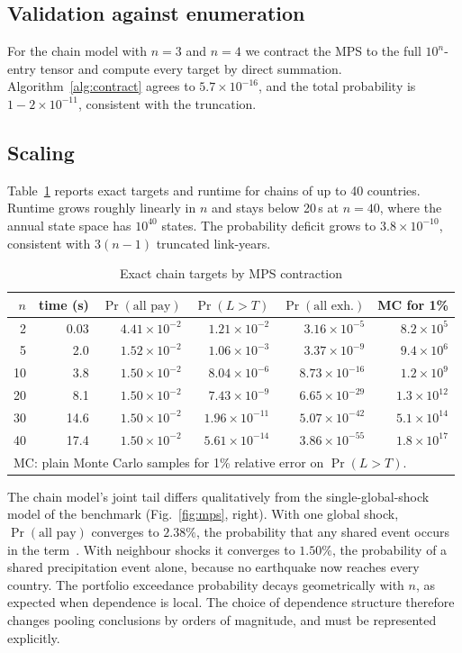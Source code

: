 \documentclass[conference]{IEEEtran}
\begin{document}
\subsection{Validation against enumeration}\label{sec:valid}
For the chain model with $n=3$ and $n=4$ we contract the MPS to the full $10^{n}$-entry tensor and compute every
target by direct summation. Algorithm~\ref{alg:contract} agrees to $5.7\times10^{-16}$, and the total probability is
$1-2\times10^{-11}$, consistent with the truncation.

\subsection{Scaling}\label{sec:scale}
Table~\ref{tab:scale} reports exact targets and runtime for chains of up to 40 countries. Runtime grows roughly
linearly in $n$ and stays below 20\,s at $n=40$, where the annual state space has $10^{40}$ states. The probability
deficit grows to $3.8\times10^{-10}$, consistent with $3(n-1)$ truncated link-years.

\begin{table}[t]
\caption{Exact chain targets by MPS contraction}
\label{tab:scale}
\centering\small
\setlength{\tabcolsep}{2.6pt}
\begin{tabular}{rrrrrr}
\toprule
$n$ & time (s) & $\Pr(\text{all pay})$ & $\Pr(L>T)$ & $\Pr(\text{all exh.})$ & MC for 1\%\\
\midrule
2 & 0.03 & $4.41\times10^{-2}$ & $1.21\times10^{-2}$ & $3.16\times10^{-5}$ & $8.2\times10^{5}$\\
5 & 2.0 & $1.52\times10^{-2}$ & $1.06\times10^{-3}$ & $3.37\times10^{-9}$ & $9.4\times10^{6}$\\
10 & 3.8 & $1.50\times10^{-2}$ & $8.04\times10^{-6}$ & $8.73\times10^{-16}$ & $1.2\times10^{9}$\\
20 & 8.1 & $1.50\times10^{-2}$ & $7.43\times10^{-9}$ & $6.65\times10^{-29}$ & $1.3\times10^{12}$\\
30 & 14.6 & $1.50\times10^{-2}$ & $1.96\times10^{-11}$ & $5.07\times10^{-42}$ & $5.1\times10^{14}$\\
40 & 17.4 & $1.50\times10^{-2}$ & $5.61\times10^{-14}$ & $3.86\times10^{-55}$ & $1.8\times10^{17}$\\
\bottomrule
\multicolumn{6}{l}{\footnotesize MC: plain Monte Carlo samples for 1\% relative error on $\Pr(L>T)$.}
\end{tabular}
\end{table}

The chain model's joint tail differs qualitatively from the single-global-shock model of the benchmark
(Fig.~\ref{fig:mps}, right). With one global shock, $\Pr(\text{all pay})$ converges to $2.38\%$, the probability that
any shared event occurs in the term~\cite{paper1}. With neighbour shocks it converges to $1.50\%$, the probability of a
shared precipitation event alone, because no earthquake now reaches every country. The portfolio exceedance
probability decays geometrically with $n$, as expected when dependence is local. The choice of dependence structure
therefore changes pooling conclusions by orders of magnitude, and must be represented explicitly.
\end{document}
